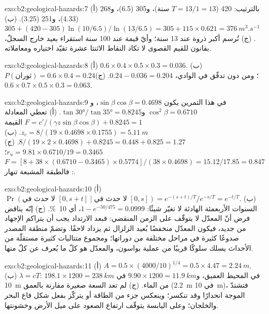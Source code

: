 \begin{solution}{exo:b2:geological-hazards:7}
(أ) بالترتيب: 420 ($T = 13/1 = 13$ سنة)، و305 (6.5)، و268 (4.33)، و251 (3.25). (ب) $305 + (420 -
305)\ln(10/6.5)/\ln(13/6.5) = 305 + 115 \times 0.621 = \qty{376}{m^3.s^{-1}}$. (ج) تُرسم أكبر ذروة
عند 13 سنة؛ وأيّ قيمة عند 100 سنة استقراء بعيد خارج السجلّ، بقانون للقيم القصوى
لا تكاد النقاط الاثنتا عشرة تقيّد اختياره ومعاملاته.
\end{solution}

\begin{solution}{exo:b2:geological-hazards:8}
(أ) $0.6 \times 0.4 \times 0.5 \times 0.3 = 0.036$. (ب) $P(\text{ثوران}) = 0.6 \times 0.4 = 0.24$؛
ومن دون تدفّق في الوادي، $0.24 - 0.036 = 0.204$. (ج) $0.6 \times 0.7 \times 0.5 \times 0.3 =
0.063$.
\end{solution}

\begin{solution}{exo:b2:geological-hazards:9}
في هذا التمرين يكون $\sin\beta\cos\beta = 0.4698$، و$\cos^2\beta = 0.6710$ و$\tan\ang{30}/\tan\ang{35} =
0.8245$. (أ) تعطي المعادلة $F = c'/(\gamma z\sin\beta\cos\beta) + 0.8245 = 1$ القيمة $z_c = 8/(19 \times 0.4698
\times 0.1755) = \qty{5.11}{m}$. (ب) $8/(19 \times 2 \times 0.4698) + 0.8245 = 0.448 + 0.825 =
1.27$. (ج) $r_u = 9.81 \times 0.6710/19 = 0.3465$؛ $F = [8 + 38 \times (0.6710 - 0.3465) \times
0.5774]/(38 \times 0.4698) = 15.12/17.85 = 0.847$: فالطبقة المشبعة تنهار.
\end{solution}

\begin{solution}{exo:b2:geological-hazards:10}
(أ) $\Pr(\text{لا حدث في } [0, s+t] \mid \text{لا حدث في } [0, s]) = e^{-(s+t)/T}/e^{-s/T} = e^{-t/T}$.
(ب) السنوات الأربعمئة الهادئة لا تغيّر شيئًا: $1 - e^{-50/475} = 0.0999$، أي \qty{10}{\percent}. (ج) إنّه
يناقض فرض أنّ المعدّل لا يتوقّف على الزمن المنقضي: فبعد الارتداد يجب أن يتراكم
الإجهاد من جديد، فيكون المعدّل منخفضًا بُعيد الزلزال ثم يزداد لاحقًا. وتضمّ منطقة المصدر
صدوعًا كثيرة في مراحل مختلفة من دوراتها؛ ومجموع متتاليات كثيرة مستقلّة
من الأحداث يسلك سلوكًا قريبًا من عملية بواسون، والمعدّل هو كلّ ما يُعرف عن كلّ منها.
\end{solution}

\begin{solution}{exo:b2:geological-hazards:11}
(أ) $A = 0.5 \times (4000/10)^{1/4} = 0.5 \times 4.47 = \qty{2.24}{m}$. (ب) $\lambda = cT$:
$198.1 \times 1200 = \qty{238}{km}$ في المحيط العميق، و$9.90 \times 1200 = \qty{11.9}{km}$ في
\qty{10}{m} من الماء. (ج) لم تعد السعة صغيرة مقارنة بالعمق (\qty{2.2}{m} في
\qty{10}{m})، فتشتدّ الموجة انحدارًا وقد تنكسر؛ وينعكس جزء من الطاقة أو يتركّز بفعل
شكل قاع البحر والخلجان؛ وعلى اليابسة يتوقّف ارتفاع الصعود على ميل الأرض
وخشونتها.
\end{solution}

